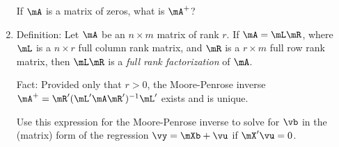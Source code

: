 \documentclass[12pt]{amsart}
\begin{document}
\begin{enumerate}
If \(\mA\) is a matrix of zeros, what is \(\mA^+\)?

\item Definition: Let \(\mA\) be an \(n\times m\) matrix of rank \(r\).  If \(\mA = \mL\mR\), where \(\mL\) is a
\(n\times r\) full column rank matrix, and \(\mR\) is a \(r\times m\) full row rank matrix, then \(\mL\mR\)
is a \emph{full rank factorization} of \(\mA\).

Fact: Provided only that \(r>0\), the Moore-Penrose inverse \(\mA^+ = \mR'(\mL'\mA\mR')^{-1}\mL'\) exists and is unique.

Use this expression for the Moore-Penrose inverse to solve for
\(\vb\) in the (matrix) form of the regression \(\vy = \mXb + \vu\)
if \(\mX'\vu=0\).
\end{enumerate}
\end{document}
